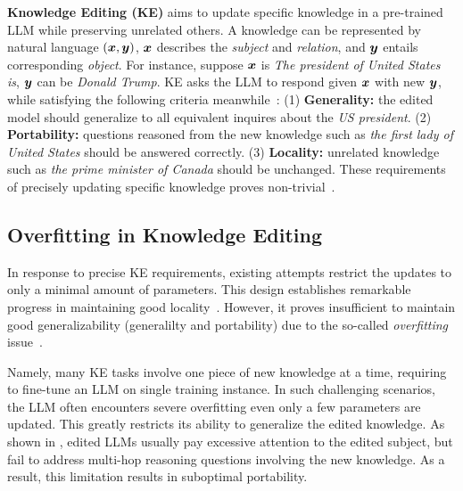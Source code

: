 \textbf{Knowledge Editing (KE)} aims to update specific knowledge in a pre-trained LLM while preserving unrelated others. 
A knowledge can be represented by natural language $(\boldsymbol{x}, \boldsymbol{y})$, $\boldsymbol{x}$ describes the \textit{subject} and \textit{relation}, and $\boldsymbol{y}$ entails corresponding \textit{object}. 
For instance, suppose $\boldsymbol{x}$ is \textit{The president of United States is}, $\boldsymbol{y}$ can be \textit{Donald Trump}. 
KE asks the LLM to respond given $\boldsymbol{x}$ with new $\boldsymbol{y}$, 
while satisfying the following criteria meanwhile~\citep{zhang2024comprehensive}:
(1) \textbf{Generality:} the edited model should generalize to all equivalent inquires about the \textit{US president}.
(2) \textbf{Portability:} questions reasoned from the new knowledge such as \textit{the first lady of United States} should be answered correctly.
(3) \textbf{Locality:} {unrelated} knowledge such as \textit{the prime minister of Canada} should be unchanged. 
These requirements of precisely updating specific knowledge proves non-trivial~\citep{wang2023knowledge,zhang2024comprehensive}. 




\subsection{Overfitting in Knowledge Editing}
In response to {precise} KE requirements, 
existing attempts restrict the updates to only a minimal amount of parameters.
This design establishes remarkable progress in maintaining good locality~\citep{zhang2024comprehensive,wang2024wise}.
However, it proves insufficient to maintain good generalizability (generalilty and {portability}) due to the so-called \textit{overfitting} issue~\citep{zhong2023mquake,zhang2024uncovering}. 


Namely,
many KE tasks involve one piece of new knowledge at a time,
requiring to fine-tune an LLM on single training instance. 
In such challenging scenarios, 
the LLM often encounters severe overfitting even only a few parameters are updated. 
This greatly restricts its ability to {generalize} the edited knowledge. 
As shown in \citet{zhong2023mquake,zhang2024uncovering}, 
edited LLMs usually pay excessive attention to the edited subject, 
but fail to address multi-hop reasoning questions involving the new knowledge.
As a result, this limitation results in suboptimal {portability}.


